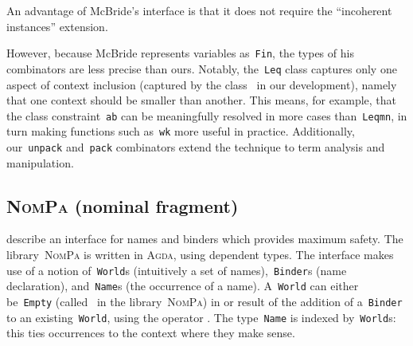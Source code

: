 \documentclass[9pt,authoryear]{sigplanconf}
\begin{document}
%
%


%
An advantage of McBride{'}s interface is that it does not require the
    {``}incoherent instances{''} extension. %


%
However, because McBride represents variables as{~}\texttt{Fin}, the types
    of his combinators are less precise than ours. Notably, the{~}\texttt{Leq}    class captures only one aspect of context inclusion (captured
    by the class{~}\texttt{\makebox[1.83ex][c]{$ \subseteq $}} in our development), namely that one context
    should be smaller than another. This means, for example, that the
    class constraint{~}\texttt{a}\texttt{\mbox{\hspace{0.50em}}}\texttt{\makebox[1.83ex][c]{$ \subseteq $}}\texttt{\mbox{\hspace{0.50em}}}\texttt{b} can be meaningfully resolved in more
    cases than{~}\texttt{Leq}\texttt{\mbox{\hspace{0.50em}}}\texttt{m}\texttt{\mbox{\hspace{0.50em}}}\texttt{n}, in turn making functions such as{~}\texttt{wk}    more useful in practice. Additionally, our{~}\texttt{unpack} and{~}\texttt{pack}    combinators extend the technique to term analysis and manipulation.%


\subsection{\textsc{NomPa} (nominal fragment)}

%
\citet{pouillard_unified_2012} describe an interface for names and
    binders which provides maximum safety. The library{~}\textsc{NomPa} is
    written in \textsc{Agda}, using dependent types. The interface makes use
    of a notion of{~}\texttt{World}s (intuitively a set of names),{~}\texttt{Binder}s
    (name declaration), and{~}\texttt{Name}s (the occurrence of a name).
    A{~}\texttt{World} can either be{~}\texttt{Empty} (called{~}\texttt{\makebox[1.22ex][c]{$ \emptyset $}} in the
    library{~}\textsc{NomPa}) in or result of the addition of a{~}\texttt{Binder} to an
    existing{~}\texttt{World}, using the operator \texttt{\makebox[1.22ex][l]{$ {(} $}}\texttt{\makebox[1.22ex][c]{\ensuremath{\triangleleft}}}\texttt{\makebox[1.22ex][r]{$ {)} $}}. The type{~}\texttt{Name} is
    indexed by{~}\texttt{World}s{:} this ties occurrences to the context where
    they make sense.%


%
%
\end{document}

